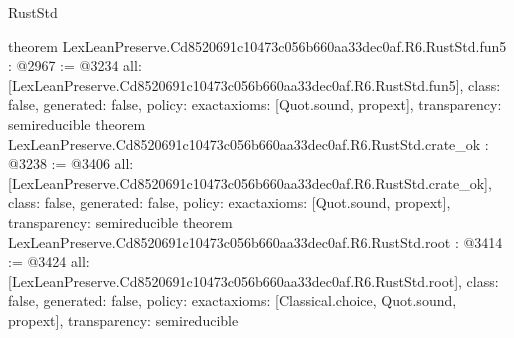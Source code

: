 \begin{lexlean}{RustStd}
\begin{coremodule}
{}
theorem LexLeanPreserve.Cd8520691c10473c056b660aa33dec0af.R6.RustStd.fun5 : @2967 := @3234 {
  all: [LexLeanPreserve.Cd8520691c10473c056b660aa33dec0af.R6.RustStd.fun5],
  class: false,
  generated: false,
  policy: exact{axioms: [Quot.sound, propext]},
  transparency: semireducible
}
theorem LexLeanPreserve.Cd8520691c10473c056b660aa33dec0af.R6.RustStd.crate_ok : @3238 := @3406 {
  all: [LexLeanPreserve.Cd8520691c10473c056b660aa33dec0af.R6.RustStd.crate_ok],
  class: false,
  generated: false,
  policy: exact{axioms: [Quot.sound, propext]},
  transparency: semireducible
}
theorem LexLeanPreserve.Cd8520691c10473c056b660aa33dec0af.R6.RustStd.root : @3414 := @3424 {
  all: [LexLeanPreserve.Cd8520691c10473c056b660aa33dec0af.R6.RustStd.root],
  class: false,
  generated: false,
  policy: exact{axioms: [Classical.choice, Quot.sound, propext]},
  transparency: semireducible
}


\end{coremodule}
\end{lexlean}
